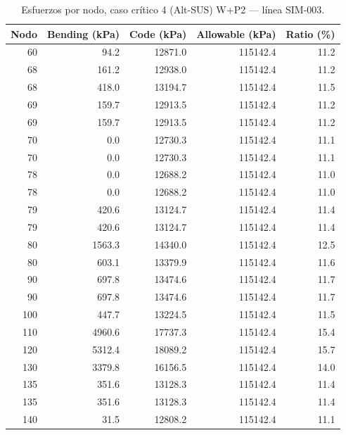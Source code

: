 \begin{table}[htbp]
  \centering
  \footnotesize
  \caption{Esfuerzos por nodo, caso crítico 4 (Alt-SUS) W+P2 — línea SIM-003.}
  \label{tab:esfuerzos-critico}
  \begin{tabular}{rrrrr}
    \toprule
    Nodo & Bending (\si{kPa}) & Code (\si{kPa}) & Allowable (\si{kPa}) & Ratio (\%) \\
    \midrule
    60 & \num{94.2} & \num{12871.0} & \num{115142.4} & 11.2 \\
    68 & \num{161.2} & \num{12938.0} & \num{115142.4} & 11.2 \\
    68 & \num{418.0} & \num{13194.7} & \num{115142.4} & 11.5 \\
    69 & \num{159.7} & \num{12913.5} & \num{115142.4} & 11.2 \\
    69 & \num{159.7} & \num{12913.5} & \num{115142.4} & 11.2 \\
    70 & \num{0.0} & \num{12730.3} & \num{115142.4} & 11.1 \\
    70 & \num{0.0} & \num{12730.3} & \num{115142.4} & 11.1 \\
    78 & \num{0.0} & \num{12688.2} & \num{115142.4} & 11.0 \\
    78 & \num{0.0} & \num{12688.2} & \num{115142.4} & 11.0 \\
    79 & \num{420.6} & \num{13124.7} & \num{115142.4} & 11.4 \\
    79 & \num{420.6} & \num{13124.7} & \num{115142.4} & 11.4 \\
    80 & \num{1563.3} & \num{14340.0} & \num{115142.4} & 12.5 \\
    80 & \num{603.1} & \num{13379.9} & \num{115142.4} & 11.6 \\
    90 & \num{697.8} & \num{13474.6} & \num{115142.4} & 11.7 \\
    90 & \num{697.8} & \num{13474.6} & \num{115142.4} & 11.7 \\
    100 & \num{447.7} & \num{13224.5} & \num{115142.4} & 11.5 \\
    110 & \num{4960.6} & \num{17737.3} & \num{115142.4} & 15.4 \\
    120 & \num{5312.4} & \num{18089.2} & \num{115142.4} & 15.7 \\
    130 & \num{3379.8} & \num{16156.5} & \num{115142.4} & 14.0 \\
    135 & \num{351.6} & \num{13128.3} & \num{115142.4} & 11.4 \\
    135 & \num{351.6} & \num{13128.3} & \num{115142.4} & 11.4 \\
    140 & \num{31.5} & \num{12808.2} & \num{115142.4} & 11.1 \\
    \bottomrule
  \end{tabular}
\end{table}

